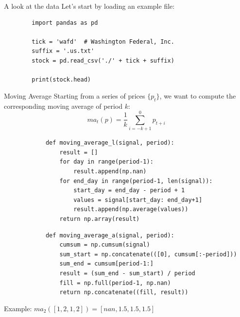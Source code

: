 \documentclass[aspectratio=169,]{beamer}
\begin{document}
\begin{frame}[fragile]{A look at the data}
    Let's start by loading an example file:
    \begin{verbatim}
        import pandas as pd

        tick = 'wafd'  # Washington Federal, Inc.
        suffix = '.us.txt'
        stock = pd.read_csv('./' + tick + suffix)

        print(stock.head)
    \end{verbatim}
\end{frame}

\begin{frame}[fragile]{Moving Average}
    Starting from a series of prices $\{p_t\}$, we want to compute the corresponding moving average of period $k$:
    \[ma_t(p) = \frac{1}{k} \sum_{i=-k+1}^{0} p_{t+i}\]

    \pause
    \begin{minipage}{0.49\textwidth}
        \begin{verbatim}
            def moving_average_l(signal, period):
                result = []
                for day in range(period-1):
                    result.append(np.nan)
                for end_day in range(period-1, len(signal)):
                    start_day = end_day - period + 1
                    values = signal[start_day: end_day+1]
                    result.append(np.average(values))
                return np.array(result)
        \end{verbatim}
    \end{minipage}
    \begin{minipage}{0.49\textwidth}
        \begin{verbatim}
            def moving_average_a(signal, period):
                cumsum = np.cumsum(signal)
                sum_start = np.concatenate(([0], cumsum[:-period]))
                sum_end = cumsum[period-1:]
                result = (sum_end - sum_start) / period
                fill = np.full(period-1, np.nan)
                return np.concatenate((fill, result))
        \end{verbatim}
    \end{minipage}

    Example: $ma_{2} ([1,2,1,2]) = [nan, 1.5, 1.5, 1.5]$
\end{frame}
\end{document}

